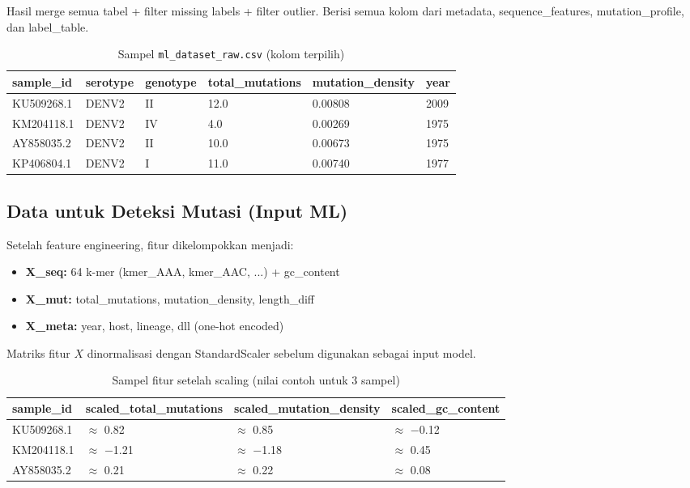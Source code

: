 \documentclass[12pt,a4paper]{article}
\begin{document}
Hasil merge semua tabel + filter missing labels + filter outlier. Berisi semua kolom dari metadata, sequence\_features, mutation\_profile, dan label\_table.

\begin{table}[h]
\centering
\caption{Sampel \texttt{ml\_dataset\_raw.csv} (kolom terpilih)}
\small
\begin{tabular}{@{}llllll@{}}
\toprule
\textbf{sample\_id} & \textbf{serotype} & \textbf{genotype} & \textbf{total\_mutations} & \textbf{mutation\_density} & \textbf{year} \\
\midrule
KU509268.1 & DENV2 & II & 12.0 & 0.00808 & 2009 \\
KM204118.1 & DENV2 & IV & 4.0 & 0.00269 & 1975 \\
AY858035.2 & DENV2 & II & 10.0 & 0.00673 & 1975 \\
KP406804.1 & DENV2 & I & 11.0 & 0.00740 & 1977 \\
\bottomrule
\end{tabular}
\end{table}

\subsection{Data untuk Deteksi Mutasi (Input ML)}

Setelah feature engineering, fitur dikelompokkan menjadi:

\begin{itemize}
    \item \textbf{X\_seq:} 64 k-mer (kmer\_AAA, kmer\_AAC, ...) + gc\_content
    \item \textbf{X\_mut:} total\_mutations, mutation\_density, length\_diff
    \item \textbf{X\_meta:} year, host, lineage, dll (one-hot encoded)
\end{itemize}

Matriks fitur $X$ dinormalisasi dengan StandardScaler sebelum digunakan sebagai input model.

\begin{table}[h]
\centering
\caption{Sampel fitur setelah scaling (nilai contoh untuk 3 sampel)}
\small
\begin{tabular}{@{}llll@{}}
\toprule
\textbf{sample\_id} & \textbf{scaled\_total\_mutations} & \textbf{scaled\_mutation\_density} & \textbf{scaled\_gc\_content} \\
\midrule
KU509268.1 & $\approx$ 0.82 & $\approx$ 0.85 & $\approx$ $-$0.12 \\
KM204118.1 & $\approx$ $-$1.21 & $\approx$ $-$1.18 & $\approx$ 0.45 \\
AY858035.2 & $\approx$ 0.21 & $\approx$ 0.22 & $\approx$ 0.08 \\
\bottomrule
\end{tabular}
\end{table}
\end{document}
